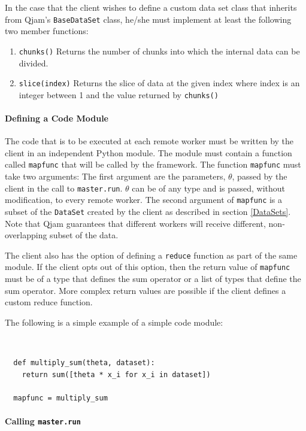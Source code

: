 \documentclass[%
  final,
  notitlepage,
  narroweqnarray,
  inline,
]{ieee}
\begin{document}
In the case that the client wishes to define a custom data set class that
inherits from Qjam's \texttt{BaseDataSet} class, he/she must implement at least
the following two member functions:
\begin{enumerate}
  \item
    \texttt{chunks()}
    Returns the number of chunks into which the internal data can be divided.
  \item
    \texttt{slice(index)}
    Returns the slice of data at the given index where index is an integer
    between 1 and the value returned by \texttt{chunks()}
\end{enumerate}


\paragraph{Defining a Code Module}

The code that is to be executed at each remote worker must be written by the
client in an independent Python module. The module must contain a function
called \texttt{mapfunc} that will be called by the framework. The function
\texttt{mapfunc} must take two arguments: The first argument are the parameters,
$\theta$, passed by the client in the call to \texttt{master.run}. $\theta$ can
be of any type and is passed, without modification, to every remote worker. The
second argument of \texttt{mapfunc} is a subset of the \texttt{DataSet} created
by the client as described in section \ref{DataSets}. Note that Qjam guarantees
that different workers will receive different, non-overlapping subset of the
data.

The client also has the option of defining a \texttt{reduce} function as part
of the same module. If the client opts out of this option, then the return
value of \texttt{mapfunc} must be of a type that defines the sum operator or
a list of types that define the sum operator. More complex return values are
possible if the client defines a custom reduce function.

The following is a simple example of a simple code module:

{\tt \small
\begin{verbatim}
  def multiply_sum(theta, dataset):
    return sum([theta * x_i for x_i in dataset])

  mapfunc = multiply_sum
\end{verbatim}}


\paragraph{Calling \texttt{master.run}}
\end{document}
